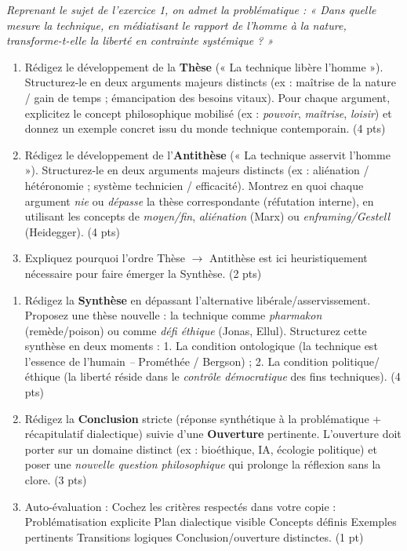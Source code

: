 \documentclass[11pt]{article}
\begin{document}
\begin{exercice}
\textit{Reprenant le sujet de l'exercice 1, on admet la problématique : « Dans quelle mesure la technique, en médiatisant le rapport de l'homme à la nature, transforme-t-elle la liberté en contrainte systémique ? »}
\begin{enumerate}
    \item Rédigez le développement de la \textbf{Thèse} (« La technique libère l'homme »). Structurez-le en deux arguments majeurs distincts (ex : maîtrise de la nature / gain de temps ; émancipation des besoins vitaux). Pour chaque argument, explicitez le concept philosophique mobilisé (ex : \textit{pouvoir}, \textit{maîtrise}, \textit{loisir}) et donnez un exemple concret issu du monde technique contemporain. (4 pts)
    \item Rédigez le développement de l'\textbf{Antithèse} (« La technique asservit l'homme »). Structurez-le en deux arguments majeurs distincts (ex : aliénation / hétéronomie ; système technicien / efficacité). Montrez en quoi chaque argument \textit{nie} ou \textit{dépasse} la thèse correspondante (réfutation interne), en utilisant les concepts de \textit{moyen/fin}, \textit{aliénation} (Marx) ou \textit{enframing/Gestell} (Heidegger). (4 pts)
    \item Expliquez pourquoi l'ordre Thèse $\rightarrow$ Antithèse est ici heuristiquement nécessaire pour faire émerger la Synthèse. (2 pts)
\end{enumerate}
\end{exercice}

\begin{exercice}
\begin{enumerate}
    \item Rédigez la \textbf{Synthèse} en dépassant l'alternative libérale/asservissement. Proposez une thèse nouvelle : la technique comme \textit{pharmakon} (remède/poison) ou comme \textit{défi éthique} (Jonas, Ellul). Structurez cette synthèse en deux moments : 1. La condition ontologique (la technique est l'essence de l'humain \textit{--} Prométhée / Bergson) ; 2. La condition politique/éthique (la liberté réside dans le \textit{contrôle démocratique} des fins techniques). (4 pts)
    \item Rédigez la \textbf{Conclusion} stricte (réponse synthétique à la problématique + récapitulatif dialectique) suivie d'une \textbf{Ouverture} pertinente. L'ouverture doit porter sur un domaine distinct (ex : bioéthique, IA, écologie politique) et poser une \textit{nouvelle question philosophique} qui prolonge la réflexion sans la clore. (3 pts)
    \item Auto-évaluation : Cochez les critères respectés dans votre copie : \fbox{} Problématisation explicite \fbox{} Plan dialectique visible \fbox{} Concepts définis \fbox{} Exemples pertinents \fbox{} Transitions logiques \fbox{} Conclusion/ouverture distinctes. (1 pt)
\end{enumerate}
\end{exercice}
\end{document}
